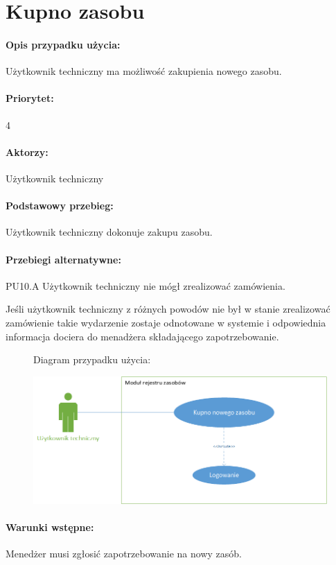 \documentclass[11pt, a4paper, oneside]{report}
\begin{document}
\section{Kupno zasobu}
\paragraph{Opis przypadku użycia:} Użytkownik techniczny ma możliwość zakupienia nowego zasobu.
\paragraph{Priorytet:} 4
\paragraph{Aktorzy:} Użytkownik techniczny
\paragraph{Podstawowy przebieg:}
Użytkownik techniczny dokonuje zakupu zasobu.
\paragraph{Przebiegi alternatywne:}

PU10.A Użytkownik techniczny nie mógł zrealizować zamówienia.

Jeśli użytkownik techniczny z różnych powodów nie był w stanie zrealizować zamówienie takie wydarzenie zostaje odnotowane w systemie i odpowiednia informacja dociera do menadżera składającego zapotrzebowanie.

\begin{figure}[H]
Diagram przypadku użycia:

\centering
\includegraphics[scale=0.8]{techniczny_kupno.png}
\end{figure}

\paragraph{Warunki wstępne:} Menedżer musi zgłosić zapotrzebowanie na nowy zasób.
\end{document}
